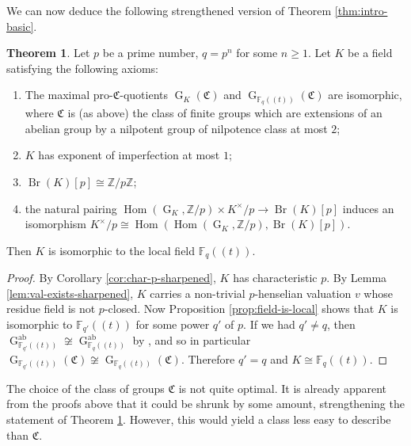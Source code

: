 \documentclass[a4paper, british, oneside]{amsart}
\newcommand{\Z}{\mathbb{Z}}
\newcommand{\F}{\mathbb{F}}
\DeclareMathOperator{\G}{G}
\DeclareMathOperator{\Br}{Br}
\DeclareMathOperator{\Hom}{Hom}
\newcommand{\pow}[1]{(\!(#1)\!)}
\theoremstyle{definition}
\newtheorem{theorem}{Theorem}[section]
\theoremstyle{remark}
\begin{document}
We can now deduce the following strengthened version of Theorem \ref{thm:intro-basic}.
\begin{theorem}\label{thm:main-sharpened}
  Let $p$ be a prime number, $q = p^n$ for some $n \geq 1$.
  Let $K$ be a field satisfying the following axioms:
  \begin{enumerate}
  \item[(Gal\textsubscript{0})]
    The maximal pro-$\mathfrak{C}$-quotients $\G_K(\mathfrak{C})$ and $\G_{\F_q\pow{t}}(\mathfrak{C})$ are isomorphic,
    where $\mathfrak{C}$ is (as above) the class of finite groups which are extensions of an abelian group by a nilpotent group of nilpotence class at most $2$;
  \item[(Imp)] $K$ has exponent of imperfection at most $1$;
  \item[(Brau)] $\Br(K)[p] \cong \Z/p\Z$;
  \item[(Pair)] the natural pairing $\Hom(\G_K, \Z/p) \times K^\times/p \to \Br(K)[p]$ induces an isomorphism $K^\times/p \cong \Hom(\Hom(\G_K, \Z/p), \Br(K)[p])$.
  \end{enumerate}
  Then $K$ is isomorphic to the local field $\F_q\pow{t}$.
\end{theorem}
\begin{proof}
  By Corollary \ref{cor:char-p-sharpened}, $K$ has characteristic $p$.
  By Lemma \ref{lem:val-exists-sharpened}, $K$ carries a non-trivial $p$-henselian valuation $v$ whose residue field is not $p$-closed.
  Now Proposition \ref{prop:field-is-local} shows that $K$ is isomorphic to $\F_{q'}\pow{t}$ for some power $q'$ of $p$.
  If we had $q' \neq q$, then $\G_{\F_{q'}\pow{t}}^{\mathrm{ab}} \not\cong \G_{\F_q\pow{t}}^{\mathrm{ab}}$ by \cite[Proposition 7.5.9]{NSW}, and so in particular $\G_{\F_{q'}\pow{t}}(\mathfrak{C}) \not\cong \G_{\F_q\pow{t}}(\mathfrak{C})$.
  Therefore $q' = q$ and $K \cong \F_q\pow{t}$.
\end{proof}

The choice of the class of groups $\mathfrak{C}$ is not quite optimal.
It is already apparent from the proofs above that it could be shrunk by some amount,
strengthening the statement of Theorem \ref{thm:main-sharpened}.
However, this would yield a class less easy to describe than $\mathfrak{C}$.



\end{document}

